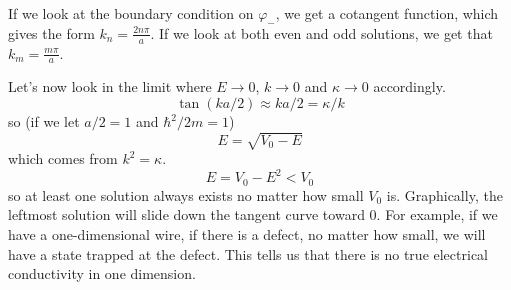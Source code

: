 \documentclass[a4paper,twoside,master.tex]{subfiles}
\begin{document}
If we look at the boundary condition on $ \varphi_- $, we get a cotangent function, which gives the form $ k_n = \frac{2 n\pi}{a} $. If we look at both even and odd solutions, we get that $ k_m = \frac{m \pi}{a} $.

Let's now look in the limit where $ E \to 0 $, $ k \to 0 $ and $ \kappa \to 0 $ accordingly.
\begin{equation}
    \tan(k a/2) \approx k a/2 = \kappa / k
\end{equation}
so (if we let $ a/2 = 1 $ and $ \hbar^2 / 2m = 1 $)
\begin{equation}
    E = \sqrt{V_0 - E}
\end{equation}
which comes from $ k^2 = \kappa $.
\begin{equation}
    E = V_0 - E^2 < V_0
\end{equation}
so at least one solution always exists no matter how small $ V_0 $ is. Graphically, the leftmost solution will slide down the tangent curve toward $ 0 $. For example, if we have a one-dimensional wire, if there is a defect, no matter how small, we will have a state trapped at the defect. This tells us that there is no true electrical conductivity in one dimension.
\end{document}
